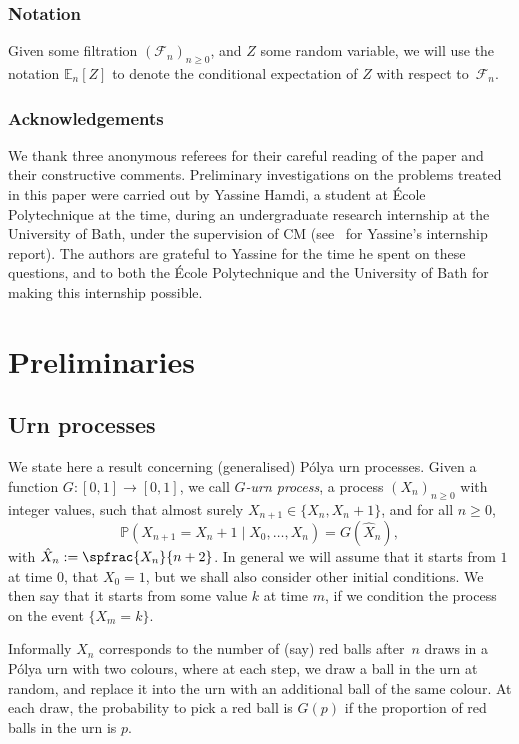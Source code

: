 \subsubsection*{Notation} Given some filtration $(\mathcal F_n)_{n\ge 0}$, and $Z$ some random variable, we will use the notation $\mathbb E_n[Z]$ to denote the conditional expectation of $Z$ with respect to~$\mathcal F_n$.

\subsubsection*{Acknowledgements}
We thank three anonymous referees for their careful reading of the paper and their constructive comments.
Preliminary investigations on the problems treated in this paper were carried out by Yassine Hamdi,
a student at École Polytechnique at the time,
during an undergraduate research internship at the University of Bath,
under the supervision of CM (see~\cite{Yassine} for Yassine's internship report).
The authors are grateful to Yassine for the time he spent on these questions,
and to both the École Polytechnique and the University of Bath for making this internship possible.

\section{Preliminaries}\label{sec.prelim}

\subsection{Urn processes}
We state here a result concerning (generalised) Pólya urn processes.
Given a function $G:[0,1]\to [0,1]$, we call \emph{$G$-urn process}, a process $(X_n)_{n\ge 0}$ with integer values, such that almost surely $X_{n+1}
\in \{X_n,X_n+1\}$, and for all $n\ge 0$,
\[
\mathbb P(X_{n+1} = X_n +1 \mid X_0,\dots,X_n) = G(\hat X_n),
\]
with $\hat X_n :=\spfrac{X_n}{n+2}$.
In general we will assume that it starts from $1$ at time $0$, \ie that $X_0=1$, but we shall also consider other initial condition{s}.
We then say that it starts from some value $k$ at time $m$, if we condition the process on the event $\{X_m=k\}$.

Informally $X_n$ corresponds
to the number of (say) red balls after~$n$ draws in a Pólya urn with two colours,
where at each step, we draw a ball in the urn at random, and replace it into the urn with an additional ball of the same colour. At each draw, the probability to pick a red ball is $G(p)$
if the proportion of red balls in the urn is $p$.

